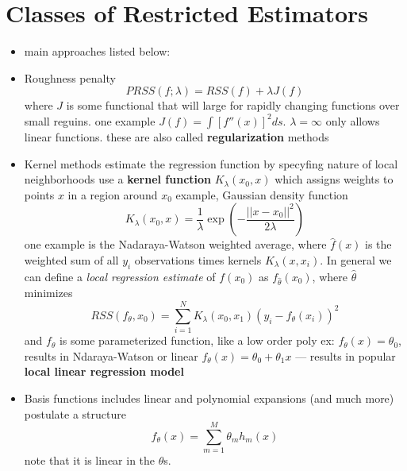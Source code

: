 \section{Classes of Restricted Estimators}
\begin{itemize}
  \item main approaches listed below:
  \item Roughness penalty
    $$ PRSS(f;\lambda) = RSS(f) + \lambda J(f) $$
    where $J$ is some functional that will large for rapidly changing functions over small reguins.
    \subitem one example $J(f) = \int [f''(x)]^2 ds$. $\lambda = \infty$ only allows linear functions.
    \subitem these are also called {\bf regularization} methods
  \item Kernel methods
    \subitem estimate the regression function by specyfing nature of local neighborhoods
    \subitem use a {\bf kernel function} $K_\lambda(x_0, x)$ which assigns weights to points $x$ in a region around $x_0$
    \subitem example, Gaussian density function
    $$ K_\lambda(x_0, x) = \frac{1}{\lambda} \exp\left(-\frac{|| x-x_0||^2 }{2\lambda}\right) $$
    \subitem one example is the Nadaraya-Watson weighted average, where $\hat{f}(x)$ is the weighted sum of all $y_i$ observations times kernels $K_\lambda(x,x_i)$.
    \subitem In general we can define a \emph{local regression estimate} of $f(x_0)$ as $f_{\hat{\theta}}(x_0)$, where $\hat{\theta}$ minimizes
    $$ RSS(f_\theta, x_0) = \sum_{i=1}^N K_\lambda(x_0, x_1)(y_i - f_\theta(x_i))^2 $$
    and $f_\theta$ is some parameterized function, like a low order poly
    \subitem ex:  $f_\theta(x) = \theta_0$, results in Ndaraya-Watson
    \subitem or linear $f_\theta(x) = \theta_0 + \theta_1 x$ --- results in popular {\bf local linear regression model}
  \item Basis functions 
    \subitem includes linear and polynomial expansions (and much more)
    \subitem postulate a structure
    $$ f_\theta(x) = \sum_{m=1}^M \theta_m h_m(x) $$
    \subitem note that it is linear in the $\theta$s.
\end{itemize}

